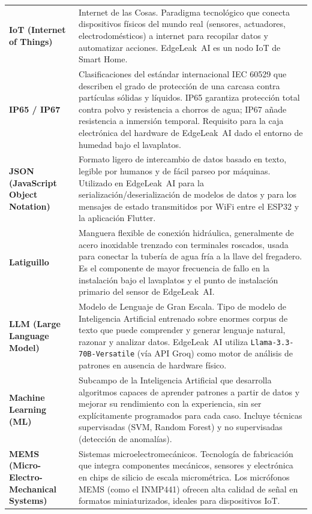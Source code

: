 \documentclass[12pt,a4paper]{article}
\begin{document}
\begin{longtable}{>{\bfseries}p{3.8cm} p{10.5cm}}
IoT (Internet of Things) & Internet de las Cosas. Paradigma tecnológico que conecta
dispositivos físicos del mundo real (sensores, actuadores, electrodomésticos) a internet
para recopilar datos y automatizar acciones. EdgeLeak~AI es un nodo IoT de Smart Home.
\\[0.5em]

IP65 / IP67 & Clasificaciones del estándar internacional IEC 60529 que describen el
grado de protección de una carcasa contra partículas sólidas y líquidos. IP65 garantiza
protección total contra polvo y resistencia a chorros de agua; IP67 añade resistencia a
inmersión temporal. Requisito para la caja electrónica del hardware de EdgeLeak~AI dado
el entorno de humedad bajo el lavaplatos.
\\[0.5em]

JSON (JavaScript Object Notation) & Formato ligero de intercambio de datos basado en
texto, legible por humanos y de fácil parseo por máquinas. Utilizado en EdgeLeak~AI para
la serialización/deserialización de modelos de datos y para los mensajes de estado
transmitidos por WiFi entre el ESP32 y la aplicación Flutter.
\\[0.5em]

Latiguillo & Manguera flexible de conexión hidráulica, generalmente de acero inoxidable
trenzado con terminales roscados, usada para conectar la tubería de agua fría a la
llave del fregadero. Es el componente de mayor frecuencia de fallo en la instalación
bajo el lavaplatos y el punto de instalación primario del sensor de EdgeLeak~AI.
\\[0.5em]

LLM (Large Language Model) & Modelo de Lenguaje de Gran Escala. Tipo de modelo de
Inteligencia Artificial entrenado sobre enormes corpus de texto que puede comprender y
generar lenguaje natural, razonar y analizar datos. EdgeLeak~AI utiliza
\texttt{Llama-3.3-70B-Versatile} (vía API Groq) como motor de análisis de patrones
en ausencia de hardware físico.
\\[0.5em]

Machine Learning (ML) & Subcampo de la Inteligencia Artificial que desarrolla algoritmos
capaces de aprender patrones a partir de datos y mejorar su rendimiento con la
experiencia, sin ser explícitamente programados para cada caso. Incluye técnicas
supervisadas (SVM, Random Forest) y no supervisadas (detección de anomalías).
\\[0.5em]

MEMS (Micro-Electro-Mechanical Systems) & Sistemas microelectromecánicos. Tecnología de
fabricación que integra componentes mecánicos, sensores y electrónica en chips de silicio
de escala micrométrica. Los micrófonos MEMS (como el INMP441) ofrecen alta calidad de
señal en formatos miniaturizados, ideales para dispositivos IoT.
\\[0.5em]


\end{longtable}
\end{document}
